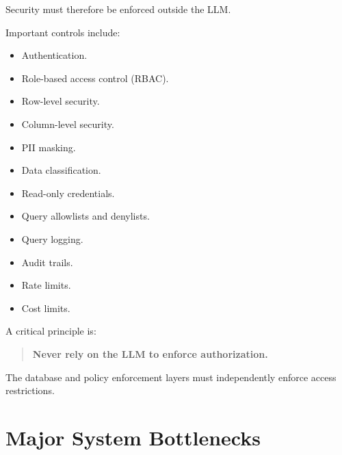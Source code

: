 \documentclass[11pt,a4paper]{article}
\newcommand{\important}[1]{\textbf{#1}}
\begin{document}
Security must therefore be enforced outside the LLM.

Important controls include:

\begin{itemize}
    \item Authentication.
    \item Role-based access control (RBAC).
    \item Row-level security.
    \item Column-level security.
    \item PII masking.
    \item Data classification.
    \item Read-only credentials.
    \item Query allowlists and denylists.
    \item Query logging.
    \item Audit trails.
    \item Rate limits.
    \item Cost limits.
\end{itemize}

A critical principle is:

\begin{quote}
\important{Never rely on the LLM to enforce authorization.}
\end{quote}

The database and policy enforcement layers must independently enforce
access restrictions.

\section{Major System Bottlenecks}
\end{document}
